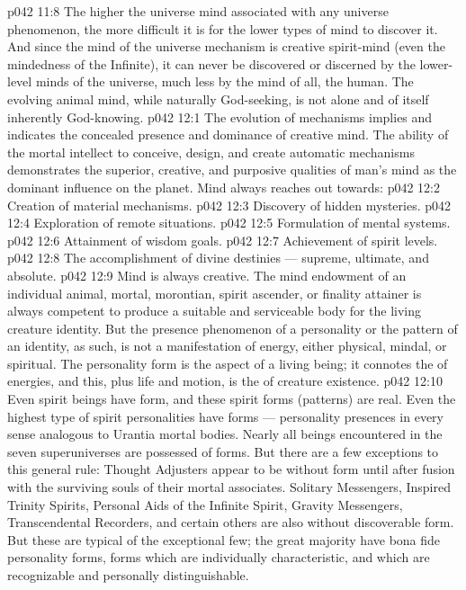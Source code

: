\vs p042 11:8 The higher the universe mind associated with any universe phenomenon, the more difficult it is for the lower types of mind to discover it. And since the mind of the universe mechanism is creative spirit\hyp{}mind (even the mindedness of the Infinite), it can never be discovered or discerned by the lower\hyp{}level minds of the universe, much less by the  mind of all, the human. The evolving animal mind, while naturally God\hyp{}seeking, is not alone and of itself inherently God\hyp{}knowing.
\vs p042 12:1 The evolution of mechanisms implies and indicates the concealed presence and dominance of creative mind. The ability of the mortal intellect to conceive, design, and create automatic mechanisms demonstrates the superior, creative, and purposive qualities of man’s mind as the dominant influence on the planet. Mind always reaches out towards:
\vs p042 12:2 \bibnobreakspace Creation of material mechanisms.
\vs p042 12:3 \bibnobreakspace Discovery of hidden mysteries.
\vs p042 12:4 \bibnobreakspace Exploration of remote situations.
\vs p042 12:5 \bibnobreakspace Formulation of mental systems.
\vs p042 12:6 \bibnobreakspace Attainment of wisdom goals.
\vs p042 12:7 \bibnobreakspace Achievement of spirit levels.
\vs p042 12:8 \bibnobreakspace The accomplishment of divine destinies --- supreme, ultimate, and absolute.
\vs p042 12:9 \pc Mind is always creative. The mind endowment of an individual animal, mortal, morontian, spirit ascender, or finality attainer is always competent to produce a suitable and serviceable body for the living creature identity. But the presence phenomenon of a personality or the pattern of an identity, as such, is not a manifestation of energy, either physical, mindal, or spiritual. The personality form is the  aspect of a living being; it connotes the  of energies, and this, plus life and motion, is the  of creature existence.
\vs p042 12:10 Even spirit beings have form, and these spirit forms (patterns) are real. Even the highest type of spirit personalities have forms --- personality presences in every sense analogous to Urantia mortal bodies. Nearly all beings encountered in the seven superuniverses are possessed of forms. But there are a few exceptions to this general rule: Thought Adjusters appear to be without form until after fusion with the surviving souls of their mortal associates. Solitary Messengers, Inspired Trinity Spirits, Personal Aids of the Infinite Spirit, Gravity Messengers, Transcendental Recorders, and certain others are also without discoverable form. But these are typical of the exceptional few; the great majority have bona fide personality forms, forms which are individually characteristic, and which are recognizable and personally distinguishable.
